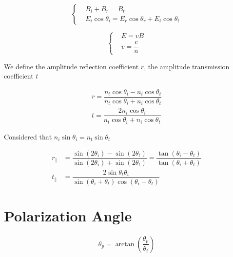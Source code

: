 \begin{equation*}
 \left\{
  \begin{aligned}
    & B_i + B_r = B_t \\
    & E_i \cos \theta_i = E_r \cos \theta_r + E_t \cos \theta_t
  \end{aligned}
  \right.
\end{equation*}

\begin{equation*}
  \left\{
  \begin{aligned}
    & E = v B \\
    & v = \dfrac{c}{n}
  \end{aligned}
  \right.
\end{equation*}

We define the amplitude reflection coefficient $r$, the amplitude transmission coefficient $t$

\begin{equation*}
  \begin{aligned}
    r = \dfrac{n_t \cos \theta_i - n_i \cos \theta_t}{n_t \cos \theta_i + n_i \cos \theta_t} \\
    t = \dfrac{2 n_i \cos \theta_i}{n_t \cos \theta_i + n_i \cos \theta_t} 
  \end{aligned}
\end{equation*}

Considered that $n_i \sin \theta_i = n_t \sin \theta_t$

\begin{equation*}
  \begin{aligned}
    r_{\parallel} &= \dfrac{\sin \left( 2 \theta_i \right) - \sin \left( 2 \theta_t \right)}{\sin \left( 2 \theta_i \right) + \sin \left( 2 \theta_t \right)} = \dfrac{\tan \left( \theta_i - \theta_t \right)}{\tan \left( \theta_i + \theta_t \right)} \\
    t_{\parallel} &= \dfrac{2 \sin \theta_t \theta_i}{\sin \left( \theta_i + \theta_t \right) \cos \left( \theta_i - \theta_t \right)} 
  \end{aligned}
\end{equation*}

\section{Polarization Angle}

\begin{equation*}
  \begin{aligned}
    \theta_p = \arctan \left( \dfrac{\theta_p}{\theta_i}  \right)
  \end{aligned}
\end{equation*}

